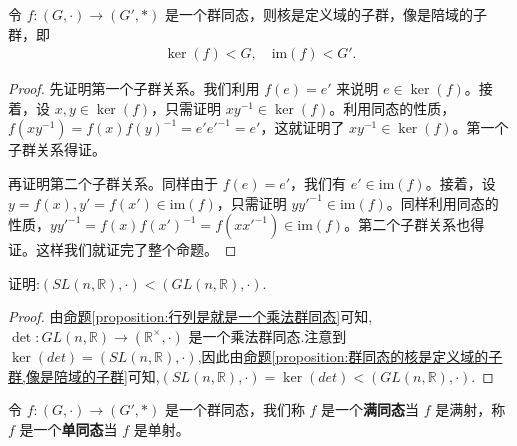 \documentclass[../../main.tex]{subfiles}
\begin{document}
\begin{proposition}\label{proposition:群同态的核是定义域的子群,像是陪域的子群}
令 $f:(G,\cdot)\to (G',*)$ 是一个群同态，则核是定义域的子群，像是陪域的子群，即
\begin{align*}
\ker(f) < G,\quad
\mathrm{im}(f) < G'.
\end{align*}
\end{proposition}
\begin{proof}
先证明第一个子群关系。我们利用 $f(e)=e'$ 来说明 $e\in\ker(f)$。接着，设 $x,y\in\ker(f)$，只需证明 $xy^{-1}\in\ker(f)$。利用同态的性质，$f(xy^{-1}) = f(x)f(y)^{-1}=e'e'^{-1}=e'$，这就证明了 $xy^{-1}\in\ker(f)$。第一个子群关系得证。

再证明第二个子群关系。同样由于 $f(e)=e'$，我们有 $e'\in\mathrm{im}(f)$。接着，设 $y = f(x),y' = f(x')\in\mathrm{im}(f)$，只需证明 $yy'^{-1}\in\mathrm{im}(f)$。同样利用同态的性质，$yy'^{-1}=f(x)f(x')^{-1}=f(xx'^{-1})\in\mathrm{im}(f)$。第二个子群关系也得证。这样我们就证完了整个命题。
\end{proof}

\begin{example}
证明:$(SL(n,\mathbb{R}),\cdot)<(GL(n,\mathbb{R}),\cdot)$.
\end{example}
\begin{proof}
由\hyperref[proposition:行列是就是一个乘法群同态]{命题\ref{proposition:行列是就是一个乘法群同态}}可知,$\det : GL(n, \mathbb{R}) \to (\mathbb{R}^\times, \cdot)$ 是一个乘法群同态.注意到$\ker (det)=(SL(n,\mathbb{R}),\cdot)$,因此由\hyperref[proposition:群同态的核是定义域的子群,像是陪域的子群]{命题\ref{proposition:群同态的核是定义域的子群,像是陪域的子群}}可知,$(SL(n,\mathbb{R}),\cdot)=\ker (det)<(GL(n,\mathbb{R}),\cdot)$.
\end{proof}

\begin{definition}[满同态与单同态]
令 $f:(G,\cdot)\to (G',*)$ 是一个群同态，我们称 $f$ 是一个\textbf{满同态}当 $f$ 是满射，称 $f$ 是一个\textbf{单同态}当 $f$ 是单射。 
\end{definition}
\end{document}

